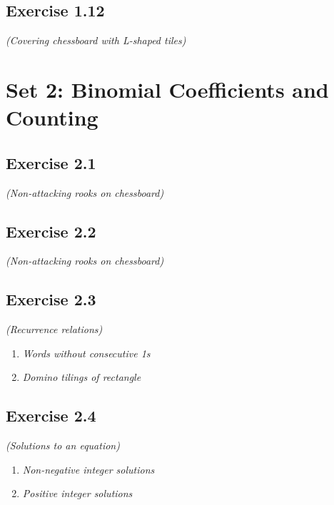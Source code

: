 \documentclass[12pt,a4paper]{article}
\begin{document}
\vspace{1cm}

\subsection*{Exercise 1.12}
\textit{(Covering  chessboard with L-shaped tiles)}

\vspace{1cm}

\section{Set 2: Binomial Coefficients and Counting}

\subsection*{Exercise 2.1}
\textit{(Non-attacking rooks on  chessboard)}

\vspace{1cm}

\subsection*{Exercise 2.2}
\textit{(Non-attacking rooks on chessboard)}

\vspace{1cm}

\subsection*{Exercise 2.3}
\textit{(Recurrence relations)}

\begin{enumerate}[label=(\roman*)]
\item \textit{Words without consecutive 1s}
\vspace{1cm}

\item \textit{Domino tilings of  rectangle}
\vspace{1cm}
\end{enumerate}

\subsection*{Exercise 2.4}
\textit{(Solutions to an equation)}

\begin{enumerate}[label=(\roman*)]
\item \textit{Non-negative integer solutions}
\vspace{1cm}

\item \textit{Positive integer solutions}
\vspace{1cm}
\end{enumerate}
\end{document}
